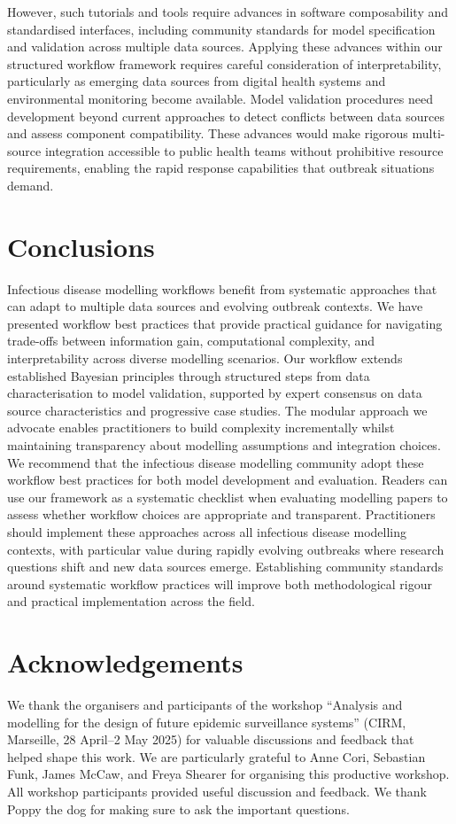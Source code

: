 \documentclass{article}
\begin{document}
However, such tutorials and tools require advances in software composability and standardised interfaces, including community standards for model specification and validation across multiple data sources.
Applying these advances within our structured workflow framework requires careful consideration of interpretability, particularly as emerging data sources from digital health systems and environmental monitoring become available.
Model validation procedures need development beyond current approaches to detect conflicts between data sources and assess component compatibility.
These advances would make rigorous multi-source integration accessible to public health teams without prohibitive resource requirements, enabling the rapid response capabilities that outbreak situations demand.

\section{Conclusions}

Infectious disease modelling workflows benefit from systematic approaches that can adapt to multiple data sources and evolving outbreak contexts.
We have presented workflow best practices that provide practical guidance for navigating trade-offs between information gain, computational complexity, and interpretability across diverse modelling scenarios.
Our workflow extends established Bayesian principles through structured steps from data characterisation to model validation, supported by expert consensus on data source characteristics and progressive case studies.
The modular approach we advocate enables practitioners to build complexity incrementally whilst maintaining transparency about modelling assumptions and integration choices.
We recommend that the infectious disease modelling community adopt these workflow best practices for both model development and evaluation.
Readers can use our framework as a systematic checklist when evaluating modelling papers to assess whether workflow choices are appropriate and transparent.
Practitioners should implement these approaches across all infectious disease modelling contexts, with particular value during rapidly evolving outbreaks where research questions shift and new data sources emerge.
Establishing community standards around systematic workflow practices will improve both methodological rigour and practical implementation across the field.

\section{Acknowledgements}

We thank the organisers and participants of the workshop ``Analysis and modelling for the design of future epidemic surveillance systems'' (CIRM, Marseille, 28 April–2 May 2025) for valuable discussions and feedback that helped shape this work.
We are particularly grateful to Anne Cori, Sebastian Funk, James McCaw, and Freya Shearer for organising this productive workshop.
All workshop participants provided useful discussion and feedback.
We thank Poppy the dog for making sure to ask the important questions.



\end{document}
